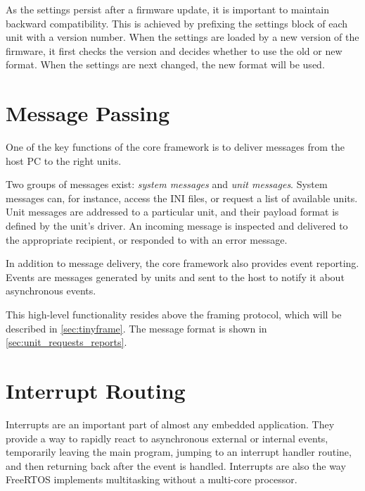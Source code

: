 As the settings persist after a firmware update, it is important to maintain backward compatibility. This is achieved by prefixing the settings block of each unit with a version number. When the settings are loaded by a new version of the firmware, it first checks the version and decides whether to use the old or new format. When the settings are next changed, the new format will be used.

%


\section{Message Passing} \label{sec:message_passing}

One of the key functions of the core framework is to deliver messages from the host \gls{PC} to the right units.

Two groups of messages exist: \textit{system messages} and \textit{unit messages}. System messages can, for instance, access the INI files, or request a list of available units. Unit messages are addressed to a particular unit, and their payload format is defined by the unit's driver. An incoming message is inspected and delivered to the appropriate recipient, or responded to with an error message.

In addition to message delivery, the core framework also provides event reporting. Events are messages generated by units and sent to the host to notify it about asynchronous events.

This high-level functionality resides above the framing protocol, which will be described in \cref{sec:tinyframe}. The message format is shown in \cref{sec:unit_requests_reports}.


\section{Interrupt Routing} \label{sec:irq-routing}

Interrupts are an important part of almost any embedded application. They provide a way to rapidly react to asynchronous external or internal events, temporarily leaving the main program, jumping to an interrupt handler routine, and then returning back after the event is handled. Interrupts are also the way FreeRTOS implements multitasking without a multi-core processor.

